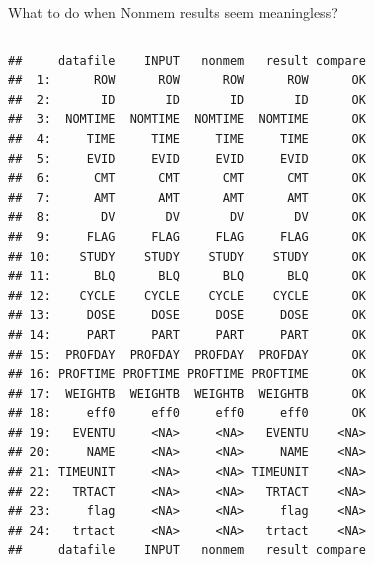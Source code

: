 \documentclass[
  8pt,
  ignorenonframetext,
  aspectratio=169]{beamer}
\begin{document}
\begin{frame}[fragile]{What to do when Nonmem results seem meaningless?}
\begin{columns}[T]
\begin{column}{0.48\textwidth}
\begin{verbatim}
##     datafile    INPUT   nonmem   result compare
##  1:      ROW      ROW      ROW      ROW      OK
##  2:       ID       ID       ID       ID      OK
##  3:  NOMTIME  NOMTIME  NOMTIME  NOMTIME      OK
##  4:     TIME     TIME     TIME     TIME      OK
##  5:     EVID     EVID     EVID     EVID      OK
##  6:      CMT      CMT      CMT      CMT      OK
##  7:      AMT      AMT      AMT      AMT      OK
##  8:       DV       DV       DV       DV      OK
##  9:     FLAG     FLAG     FLAG     FLAG      OK
## 10:    STUDY    STUDY    STUDY    STUDY      OK
## 11:      BLQ      BLQ      BLQ      BLQ      OK
## 12:    CYCLE    CYCLE    CYCLE    CYCLE      OK
## 13:     DOSE     DOSE     DOSE     DOSE      OK
## 14:     PART     PART     PART     PART      OK
## 15:  PROFDAY  PROFDAY  PROFDAY  PROFDAY      OK
## 16: PROFTIME PROFTIME PROFTIME PROFTIME      OK
## 17:  WEIGHTB  WEIGHTB  WEIGHTB  WEIGHTB      OK
## 18:     eff0     eff0     eff0     eff0      OK
## 19:   EVENTU     <NA>     <NA>   EVENTU    <NA>
## 20:     NAME     <NA>     <NA>     NAME    <NA>
## 21: TIMEUNIT     <NA>     <NA> TIMEUNIT    <NA>
## 22:   TRTACT     <NA>     <NA>   TRTACT    <NA>
## 23:     flag     <NA>     <NA>     flag    <NA>
## 24:   trtact     <NA>     <NA>   trtact    <NA>
##     datafile    INPUT   nonmem   result compare
\end{verbatim}

\normalsize
\end{column}
\end{columns}
\end{frame}
\end{document}
